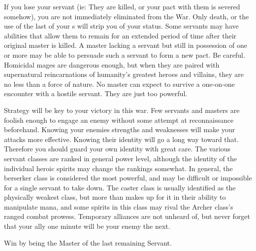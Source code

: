 \documentclass[blue]{FateDarkDawn}
\begin{document}
If you lose your servant (ie: They are killed, or your pact with them is severed somehow), you are not immediately eliminated from the War. Only death, or the use of the last of your \iCommand{\MYname}s will strip you of your status. Some servants may have abilities that allow them to remain for an extended period of time after their original master is killed. A master lacking a servant but still in possession of one or more \iCommand{\MYname} may be able to persuade such a servant to form a new pact. Be careful. Homicidal mages are dangerous enough, but when they are paired with supernatural reincarnations of humanity's greatest heroes and villains, they are no less than a force of nature. No master can expect to survive a one-on-one encounter with a hostile servant. They are just too powerful. 

Strategy will be key to your victory in this war. Few servants and masters are foolish enough to engage an enemy without some attempt at reconnaissance beforehand. Knowing your enemies strengths and weaknesses will make your attacks more effective. Knowing their identity will go a long way toward that. Therefore you should guard your own identity with great care. The various servant classes are ranked in general power level, although the identity of the individual heroic spirits may change the rankings somewhat. In general, the berserker class is considered the most powerful, and may be difficult or impossible for a single servant to take down. The caster class is usually identified as the physically weakest class, but more than makes up for it in their ability to manipulate mana, and some spirits in this class may rival the Archer class's ranged combat prowess. Temporary alliances are not unheard of, but never forget that your ally one minute will be your enemy the next.

\begin{itemz}[Goals]
	\item Win \iGrail{} by being the Master of the last remaining Servant.
\end{itemz}
\end{document}
